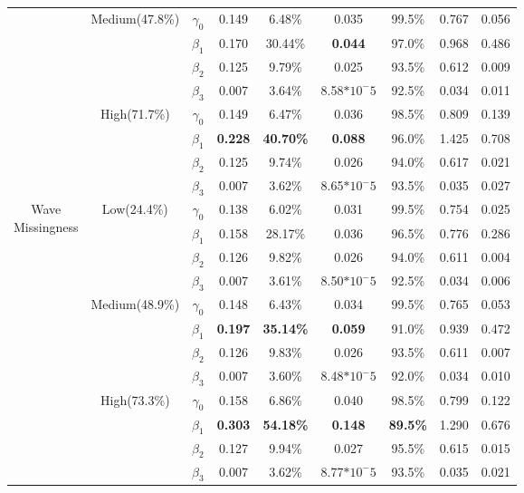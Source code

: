 \documentclass{svjour3}\usepackage[]{graphicx}\usepackage[]{color}
\begin{document}
\begin{table}[p]
\begin{tabular}{c|c|c|cccccc}
		&\multirow{4}{*}{Medium(47.8\%)}
		& $\gamma_0$ & 0.149 & 6.48\% & 0.035 & 99.5\% & 0.767 & 0.056 \\
		&& $\beta_1$ & 0.170 & 30.44\% & \textbf{0.044} & 97.0\% & 0.968 & 0.486 \\
		&& $\beta_2$ & 0.125 & 9.79\% & 0.025 & 93.5\% & 0.612 & 0.009 \\
		&& $\beta_3$ & 0.007 & 3.64\% & 8.58$*10^-5$ & 92.5\% & 0.034 & 0.011 \\ \cline{2-9} \noalign{\smallskip}
		& \multirow{4}{*}{High(71.7\%)}
		& $\gamma_0$ & 0.149 & 6.47\% & 0.036 & 98.5\% & 0.809 & 0.139 \\
		&& $\beta_1$ & \textbf{0.228} & \textbf{40.70\%} & \textbf{0.088} & 96.0\% & 1.425 & 0.708 \\
		&& $\beta_2$ & 0.125 & 9.74\% & 0.026 & 94.0\% & 0.617 & 0.021 \\
		&& $\beta_3$ & 0.007 & 3.62\% & 8.65$*10^-5$ & 93.5\% & 0.035 & 0.027 \\
		\midrule
		\midrule
		\multirow{12}{*}{\parbox{1.75cm}{Wave \\ Missingness}}
		& \multirow{4}{*}{Low(24.4\%)}
		& $\gamma_0$ & 0.138 & 6.02\% & 0.031 & 99.5\% & 0.754 & 0.025 \\
		&& $\beta_1$ & 0.158 & 28.17\% & 0.036 & 96.5\% & 0.776 & 0.286 \\
		&& $\beta_2$ & 0.126 & 9.82\% & 0.026 & 94.0\% & 0.611 & 0.004 \\
		&& $\beta_3$ & 0.007 & 3.61\% & 8.50$*10^-5$ & 92.5\% & 0.034 & 0.006 \\ \cline{2-9} \noalign{\smallskip}
		&\multirow{4}{*}{Medium(48.9\%)}
		& $\gamma_0$ & 0.148 & 6.43\% & 0.034 & 99.5\% & 0.765 & 0.053 \\
		&& $\beta_1$ & \textbf{0.197} & \textbf{35.14\%} & \textbf{0.059} & 91.0\% & 0.939 & 0.472 \\
		&& $\beta_2$ & 0.126 & 9.83\% & 0.026 & 93.5\% & 0.611 & 0.007 \\
		&& $\beta_3$ & 0.007 & 3.60\% & 8.48$*10^-5$ & 92.0\% & 0.034 & 0.010 \\ \cline{2-9} \noalign{\smallskip}
		& \multirow{4}{*}{High(73.3\%)}
		& $\gamma_0$ & 0.158 & 6.86\% & 0.040 & 98.5\% & 0.799 & 0.122 \\
		&& $\beta_1$ & \textbf{0.303} & \textbf{54.18\%} &\textbf{0.148} & \textbf{89.5\%} & 1.290 & 0.676 \\
		&& $\beta_2$ & 0.127 & 9.94\% & 0.027 & 95.5\% & 0.615 & 0.015 \\
		&& $\beta_3$ & 0.007 & 3.62\% & 8.77$*10^-5$ & 93.5\% & 0.035 & 0.021 \\
		\bottomrule
	\end{tabular}	
\end{table}
\end{document}
